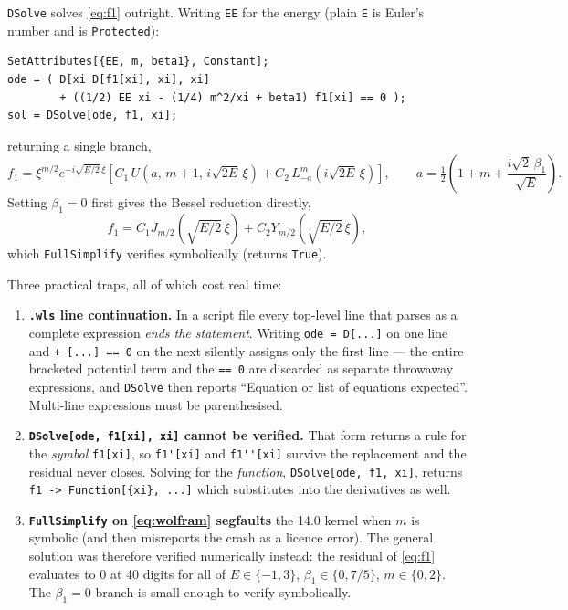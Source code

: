 \documentclass[11pt]{article}
\begin{document}
\verb|DSolve| solves \eqref{eq:f1} outright.  Writing \verb|EE| for the
energy (plain \verb|E| is Euler's number and is \verb|Protected|):
\begin{lstlisting}
SetAttributes[{EE, m, beta1}, Constant];
ode = ( D[xi D[f1[xi], xi], xi]
        + ((1/2) EE xi - (1/4) m^2/xi + beta1) f1[xi] == 0 );
sol = DSolve[ode, f1, xi];
\end{lstlisting}
returning a single branch,
\begin{equation}\label{eq:wolfram}
f_1 = \xi^{m/2} e^{-i\sqrt{E/2}\,\xi}
      \left[ C_1\, U(a,\,m+1,\,i\sqrt{2E}\,\xi)
           + C_2\, L^{m}_{-a}(i\sqrt{2E}\,\xi) \right],
\qquad a = \tfrac{1}{2}\!\left(1+m+\frac{i\sqrt2\,\beta_1}{\sqrt E}\right).
\end{equation}
Setting $\beta_1=0$ first gives the Bessel reduction directly,
\begin{equation}
f_1 = C_1 J_{m/2}\!\left(\sqrt{E/2}\,\xi\right)
    + C_2 Y_{m/2}\!\left(\sqrt{E/2}\,\xi\right),
\end{equation}
which \verb|FullSimplify| verifies symbolically (returns \verb|True|).

Three practical traps, all of which cost real time:

\begin{enumerate}
\item \textbf{\texttt{.wls} line continuation.}  In a script file every
  top-level line that parses as a complete expression \emph{ends the
  statement}.  Writing \verb|ode = D[...]| on one line and
  \verb|+ [...] == 0| on the next silently assigns only the first line ---
  the entire bracketed potential term and the \verb|== 0| are discarded as
  separate throwaway expressions, and \verb|DSolve| then reports
  ``Equation or list of equations expected''.  Multi-line expressions must
  be parenthesised.

\item \textbf{\texttt{DSolve[ode, f1[xi], xi]} cannot be verified.}  That
  form returns a rule for the \emph{symbol} \verb|f1[xi]|, so \verb|f1'[xi]|
  and \verb|f1''[xi]| survive the replacement and the residual never
  closes.  Solving for the \emph{function}, \verb|DSolve[ode, f1, xi]|,
  returns \verb|f1 -> Function[{xi}, ...]| which substitutes into the
  derivatives as well.

\item \textbf{\texttt{FullSimplify} on \eqref{eq:wolfram} segfaults} the
  14.0 kernel when $m$ is symbolic (and then misreports the crash as a
  licence error).  The general solution was therefore verified numerically
  instead: the residual of \eqref{eq:f1} evaluates to $0$ at 40 digits for
  all of $E\in\{-1,3\}$, $\beta_1\in\{0,7/5\}$, $m\in\{0,2\}$.  The
  $\beta_1=0$ branch is small enough to verify symbolically.
\end{enumerate}
\end{document}

